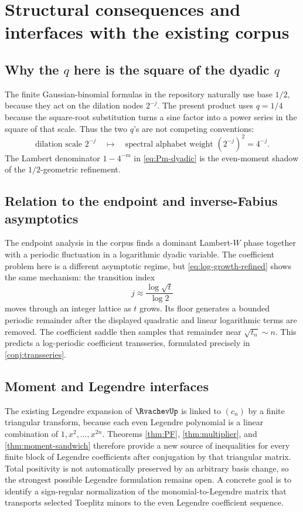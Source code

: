 \documentclass[11pt]{article}
\numberwithin{equation}{section}
\theoremstyle{definition}
\theoremstyle{remark}
\begin{document}
\section{Structural consequences and interfaces with the existing corpus}\label{sec:interfaces}

\subsection{Why the $q$ here is the square of the dyadic $q$}

The finite Gaussian-binomial formulas in the repository naturally use base $1/2$, because they act on the dilation nodes $2^{-j}$.  The present product uses $q=1/4$ because the square-root substitution turns a sine factor into a power series in the square of that scale.  Thus the two $q$'s are not competing conventions:
\[
 \text{dilation scale }2^{-j}
 \quad\longmapsto\quad
 \text{spectral alphabet weight }(2^{-j})^2=4^{-j}.
\]
The Lambert denominator $1-4^{-m}$ in \eqref{eq:Pm-dyadic} is the even-moment shadow of the $1/2$-geometric refinement.

\subsection{Relation to the endpoint and inverse-Fabius asymptotics}

The endpoint analysis in the corpus finds a dominant Lambert-$W$ phase together with a periodic fluctuation in a logarithmic dyadic variable.  The coefficient problem here is a different asymptotic regime, but \eqref{eq:log-growth-refined} shows the same mechanism: the transition index
\[
 j\approx\frac{\log\sqrt t}{\log2}
\]
moves through an integer lattice as $t$ grows.  Its floor generates a bounded periodic remainder after the displayed quadratic and linear logarithmic terms are removed.  The coefficient saddle then samples that remainder near $\sqrt{t_n}\sim n$.  This predicts a log-periodic coefficient transseries, formulated precisely in \cref{conj:transseries}.

\subsection{Moment and Legendre interfaces}

The existing Legendre expansion of $\RvachevUp$ is linked to $(c_n)$ by a finite triangular transform, because each even Legendre polynomial is a linear combination of $1,x^2,\ldots,x^{2n}$.  Theorems \ref{thm:PF}, \ref{thm:multiplier}, and \ref{thm:moment-sandwich} therefore provide a new source of inequalities for every finite block of Legendre coefficients after conjugation by that triangular matrix.  Total positivity is not automatically preserved by an arbitrary basis change, so the strongest possible Legendre formulation remains open.  A concrete goal is to identify a sign-regular normalization of the monomial-to-Legendre matrix that transports selected Toeplitz minors to the even Legendre coefficient sequence.
\end{document}
